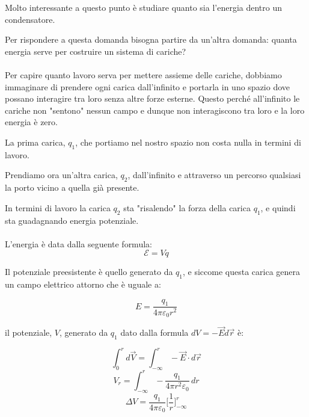 Molto interessante a questo punto è studiare quanto sia l'energia dentro un condensatore.

Per rispondere a questa domanda bisogna partire da un'altra domanda: quanta energia serve per costruire un sistema di cariche?

\paragraph{}
Per capire quanto lavoro serva per mettere assieme delle cariche, dobbiamo immaginare di prendere ogni carica dall'infinito e portarla in uno spazio dove possano interagire tra loro senza altre forze esterne. Questo perché all'infinito le cariche non "sentono" nessun campo e dunque non interagiscono tra loro e la loro energia è zero.

La prima carica, $q_1$, che portiamo nel nostro spazio non costa nulla in termini di lavoro.

Prendiamo ora un'altra carica, $q_2$, dall'infinito e attraverso un percorso qualsiasi la porto vicino a quella già presente.

In termini di lavoro la carica $q_2$ sta "risalendo" la forza della carica $q_1$, e quindi sta guadagnando energia potenziale.
\paragraph{}
L'energia è data dalla seguente formula:
\begin{equation}
    \mathcal{E} = Vq
\end{equation}

 Il potenziale preesistente è quello generato da $q_1$, e siccome questa carica genera un campo elettrico attorno che è uguale a:
 
 \begin{equation*}
     E = \frac{q_1}{4\pi\varepsilon_0 r^2}
 \end{equation*}
 
 il potenziale, $V$, generato da $q_1$ dato dalla formula $dV = - \vec{E}d\vec{r}$ è:
 
 \begin{equation*}
    \int_{0}^{r} d\vec{V} = \int_{-\infty}^{r} - \vec{E}\cdot d\vec{r}
\end{equation*}
\begin{equation*}
    V_{r} = \int_{-\infty}^{r} - \frac{q_1}{4\pi r^2 \varepsilon_0}\,dr
\end{equation*}
\begin{equation*}
    \Delta V  = \frac{q_1}{4\pi \varepsilon_0}\biggl[ \frac{1}{r}\biggl]_{-\infty}^r
\end{equation*}

